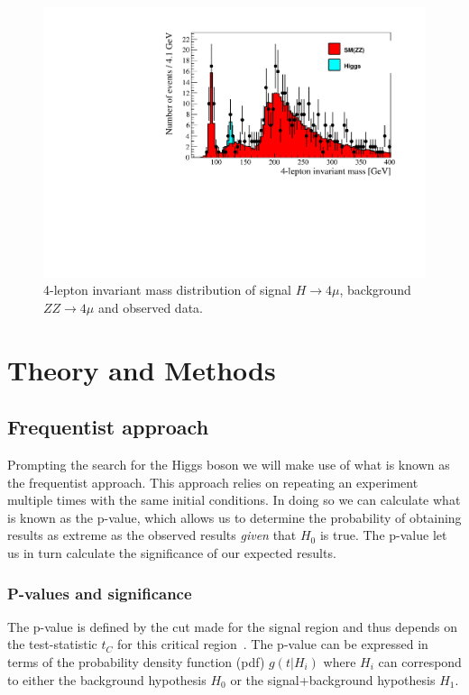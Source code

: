 \documentclass[12pt,a4paper]{amsart}
\begin{document}
\begin{figure}
\centering
\includegraphics[width=.8\textwidth]{../data/11_1/MassPlot_rebin20.pdf}
\caption{4-lepton invariant mass distribution of signal $H\rightarrow 4\mu$, background $ZZ\rightarrow 4\mu$ and observed data.}
\label{fig:mass_distribution_mll}
\end{figure}

\section{Theory and Methods} \label{sec:theory_and_methods}
\subsection{Frequentist approach} \label{subsec:theory_frequentist_approach}
Prompting the search for the Higgs boson we will make use of what is known as the frequentist approach. This approach relies on repeating an experiment multiple times with the same initial conditions. In doing so we can calculate what is known as the p-value, which allows us to determine the probability of obtaining results as extreme as the observed results \textit{given} that $H_0$ is true. The p-value let us in turn calculate the significance of our expected results.

\subsubsection{P-values and significance} \label{subsec:Theory-p-values_and_significance}
The p-value is defined by the cut made for the signal region and thus depends on the test-statistic $t_C$ for this critical region~\cite{Behnke_2015:Data_analysis_in_HEP}. The p-value can be expressed in terms of the probability density function (pdf) $g(t|H_i)$ where $H_i$ can correspond to either the background hypothesis $H_0$ or the signal+background hypothesis $H_1$.
\end{document}
